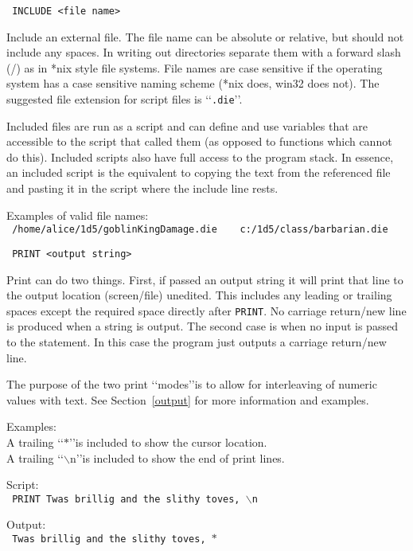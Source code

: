 \breakline

\noindent\texttt{%
INCLUDE <file name>}

Include an external file. The file name can be absolute or relative, but
should not include any spaces. In writing out directories separate them with a
forward slash (/) as in *nix style file systems. File names are case sensitive
if the operating system has a case sensitive naming scheme (*nix does, win32
does not). The suggested file extension for script files is
\lq\lq\texttt{.die}\rq\rq.

Included files are run as a script and can define and use variables that are
accessible to the script that called them (as opposed to functions which
cannot do this). Included scripts also have full access to the program stack.
In essence, an included script is the equivalent to copying the text from the
referenced file and pasting it in the script where the include line rests.

\noindent Examples of valid file names:\\
\texttt{%
/home/alice/1d5/goblinKingDamage.die \ \ \ c:/1d5/class/barbarian.die
}

\breakline

\noindent\texttt{%
PRINT <output string>}

Print can do two things. First, if passed an output string it will print that
line to the output location (screen/file) unedited. This includes any leading
or trailing spaces except the required space directly after \texttt{PRINT}. No
carriage return/new line is produced when a string is output.
The second case is when no input is passed to the statement. In this case the
program just outputs a carriage return/new line.

The purpose of the two print \lq\lq modes\rq\rq is to allow for interleaving of
numeric values with text. See Section~\ref{output} for more information and
examples.

\noindent Examples:\\
A trailing \lq\lq$\ast$\rq\rq is included to show the cursor location.\\
A trailing \lq\lq$\backslash$n\rq\rq is included to show the end of print lines.

\noindent Script:\\
\texttt{%
PRINT Twas brillig and the slithy toves, $\backslash$n
}

\noindent Output:\\
\texttt{%
Twas brillig and the slithy toves, $\ast$
}


